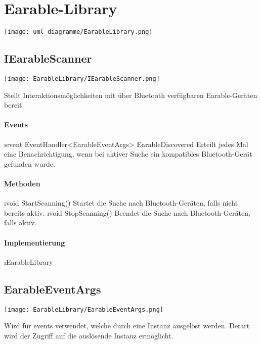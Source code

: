 \documentclass[../entwurf.tex]{subfiles}
\begin{document}
\section{Earable-Library}

\texttt{[image: uml\_diagramme/EarableLibrary.png]}

\subsection{IEarableScanner}
\begin{center}
	\texttt{[image: EarableLibrary/IEarableScanner.png]}
\end{center}
Stellt Interaktionsmöglichkeiten mit über Bluetooth verfügbaren Earable-Geräten bereit.
\paragraph{Events}
\begin{itemize}
	\i{event EventHandler<EarableEventArgs> EarableDiscovered} Erteilt jedes Mal eine Benachrichtigung, wenn bei aktiver Suche ein kompatibles Bluetooth-Gerät gefunden wurde.
\end{itemize}
\paragraph{Methoden}
\begin{itemize}
	\i{void StartScanning()} Startet die Suche nach Bluetooth-Geräten, falls nicht bereits aktiv.
	\i{void StopScanning()} Beendet die Suche nach Bluetooth-Geräten, falls aktiv.
\end{itemize}
\paragraph{Implementierung}
\begin{itemize}
	\i{EarableLibrary}
\end{itemize}

\subsection{EarableEventArgs}
\begin{center}
	\texttt{[image: EarableLibrary/EarableEventArgs.png]}
\end{center}
Wird für \Gls{event}s verwendet, welche durch eine  Instanz ausgelöst werden. Derart wird der Zugriff auf die auslösende Instanz ermöglicht.
\end{document}

